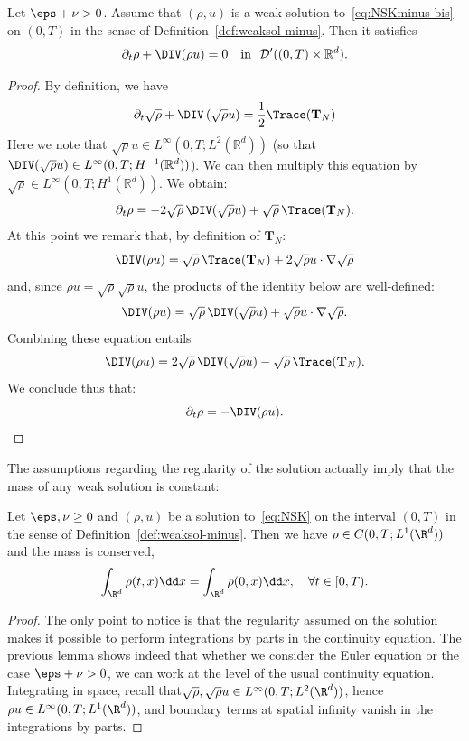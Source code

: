 \begin{lemm}\label{lem:continuite}
Let $\eps + \nu >0$. Assume that $(\rho,u)$ is a weak solution to~\eqref{eq:NSKminus-bis} on $(0,T)$ in the sense of Definition~\ref{def:weaksol-minus}. Then it satisfies
\[
\partial_t \rho + \DIV(\rho u) = 0 \quad \text{in \ $\mathcal D'((0,T) \times \mathbb R^d).$}
\]
\end{lemm}

\begin{proof}
By definition, we have
\[
\partial_t\sqrt{\rho}+\DIV\left(\sqrt{\rho} u\right)= \frac{1}{2}\Trace(\mathbf T_N)
\]
Here we note that $\sqrt{\rho}u \in L^{\infty}(0,T;L^{2}(\mathbb R^d))$ (so that $\DIV(\sqrt{\rho}u) \in L^{\infty}(0,T;H^{-1}(\mathbb R^d))$). We can then multiply this equation by $\sqrt{\rho} \in L^{\infty}(0,T;H^1(\mathbb R^d)).$ We obtain:
\[
\partial_t {\rho} = - 2\sqrt{\rho}\, \DIV(\sqrt{\rho}u) + \sqrt{\rho}\, \Trace(\mathbf T_N).
\]
At this point we remark that, by definition of $\mathbf T_N:$
\[
\DIV(\rho u) = \sqrt{\rho}\, \Trace(\mathbf T_N) + 2 \sqrt{\rho} u
\cdot \nabla \sqrt{\rho}
\]
and, since $\rho u = \sqrt{\rho} \sqrt{\rho} u$, the products of the identity below are well-defined:
\[
\DIV(\rho u) = \sqrt{\rho}\, \DIV(\sqrt{\rho}u) +
\sqrt{\rho} u \cdot \nabla \sqrt{\rho}.
\]
Combining these equation entails
\[
\DIV(\rho u) = 2\sqrt{\rho}\, \DIV(\sqrt{\rho} u) -
\sqrt{\rho}\, \Trace({\mathbf T}_N).
\]
We conclude thus that:
\[
\partial_t {\rho} = -\DIV(\rho u).\qedhere
\]
\end{proof}

The assumptions regarding the regularity of the solution actually imply that the mass of any weak solution is constant:

\begin{lemm}\label{lem:masse-conservee}
Let $\eps,\nu\ge 0$ and $(\rho,u)$ be a solution to~\eqref{eq:NSK} on the interval $(0,T)$ in the sense of Definition~\ref{def:weaksol-minus}. Then we have $\rho \in C(0,T;L^1(\R^d))$ and the mass is conserved,
\[
\int_{\R^d}\rho(t,x) \dd x=\int_{\R^d}\rho(0,x) \dd x,\quad \forall t\in [0,T).
\]
\end{lemm}

\begin{proof}
The only point to notice is that the regularity assumed on the solution makes it possible to perform integrations by parts in the continuity equation. The previous lemma shows indeed that whether we consider the Euler equation or the case $\eps+\nu>0$, we can work at the level of the usual continuity equation. Integrating in space, recall that$\sqrt\rho,\sqrt \rho u\in L^\infty(0,T;L^2(\R^d))$, hence $\rho u\in L^\infty(0,T;L^1(\R^d))$, and boundary terms at spatial infinity vanish in the integrations by parts.
\end{proof}

